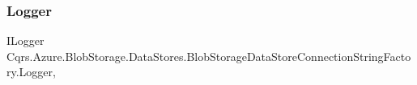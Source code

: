 \subsubsection{\texorpdfstring{Logger}{Logger}}
{\footnotesize\ttfamily I\+Logger Cqrs.\+Azure.\+Blob\+Storage.\+Data\+Stores.\+Blob\+Storage\+Data\+Store\+Connection\+String\+Factory.\+Logger\hspace{0.3cm}{\ttfamily [get]}, {\ttfamily [protected]}}

